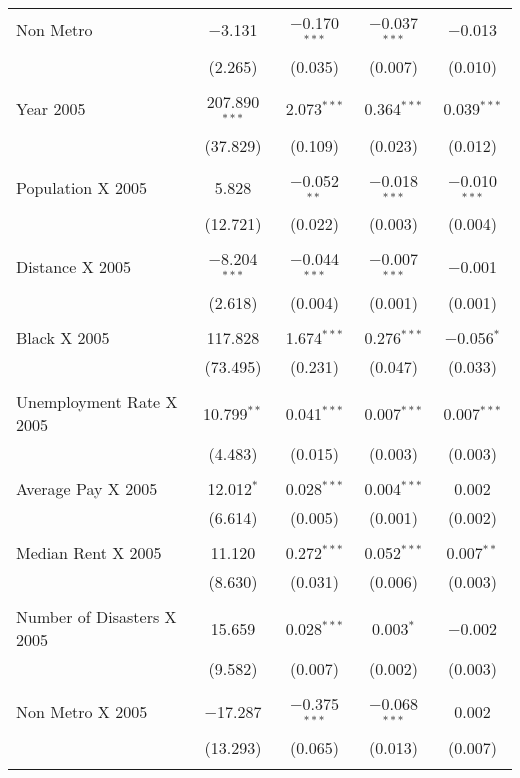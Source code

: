 \documentclass[]{article}
\begin{document}
\begin{table}[!htbp]
\begin{tabular}{@{\extracolsep{5pt}}lcccc}
 Non Metro & $-$3.131 & $-$0.170$^{***}$ & $-$0.037$^{***}$ & $-$0.013 \\ 
  & (2.265) & (0.035) & (0.007) & (0.010) \\ 
  & & & & \\ 
 Year 2005 & 207.890$^{***}$ & 2.073$^{***}$ & 0.364$^{***}$ & 0.039$^{***}$ \\ 
  & (37.829) & (0.109) & (0.023) & (0.012) \\ 
  & & & & \\ 
 Population X 2005 & 5.828 & $-$0.052$^{**}$ & $-$0.018$^{***}$ & $-$0.010$^{***}$ \\ 
  & (12.721) & (0.022) & (0.003) & (0.004) \\ 
  & & & & \\ 
 Distance X 2005 & $-$8.204$^{***}$ & $-$0.044$^{***}$ & $-$0.007$^{***}$ & $-$0.001 \\ 
  & (2.618) & (0.004) & (0.001) & (0.001) \\ 
  & & & & \\ 
 Black X 2005 & 117.828 & 1.674$^{***}$ & 0.276$^{***}$ & $-$0.056$^{*}$ \\ 
  & (73.495) & (0.231) & (0.047) & (0.033) \\ 
  & & & & \\ 
 Unemployment Rate X 2005  & 10.799$^{**}$ & 0.041$^{***}$ & 0.007$^{***}$ & 0.007$^{***}$ \\ 
  & (4.483) & (0.015) & (0.003) & (0.003) \\ 
  & & & & \\ 
 Average Pay X 2005 & 12.012$^{*}$ & 0.028$^{***}$ & 0.004$^{***}$ & 0.002 \\ 
  & (6.614) & (0.005) & (0.001) & (0.002) \\ 
  & & & & \\ 
 Median Rent X 2005 & 11.120 & 0.272$^{***}$ & 0.052$^{***}$ & 0.007$^{**}$ \\ 
  & (8.630) & (0.031) & (0.006) & (0.003) \\ 
  & & & & \\ 
 Number of Disasters X 2005 & 15.659 & 0.028$^{***}$ & 0.003$^{*}$ & $-$0.002 \\ 
  & (9.582) & (0.007) & (0.002) & (0.003) \\ 
  & & & & \\ 
 Non Metro X 2005 & $-$17.287 & $-$0.375$^{***}$ & $-$0.068$^{***}$ & 0.002 \\ 
  & (13.293) & (0.065) & (0.013) & (0.007) \\ 
  & & & & \\ 

\end{tabular}
\end{table}
\end{document}
